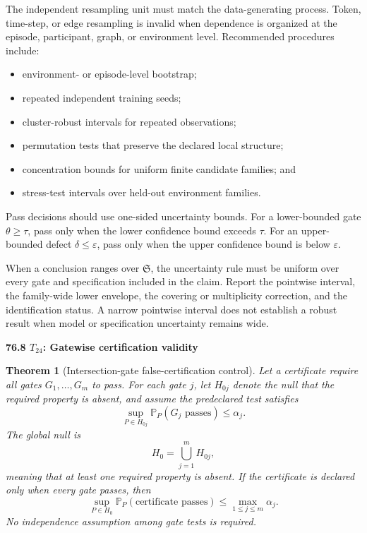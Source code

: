 \documentclass[11pt,letterpaper]{article}
\newcommand{\subtopic}[1]{%
 \vspace{0.45em}
 {\bfseries\color{AccentColor} #1\par}
}
\theoremstyle{plain}
\newtheorem{theorem}{Theorem}
\theoremstyle{definition}
\begin{document}
The independent resampling unit must match the data-generating process. Token,
time-step, or edge resampling is invalid when dependence is organized at the
episode, participant, graph, or environment level. Recommended procedures
include:
\begin{itemize}
\item environment- or episode-level bootstrap;
\item repeated independent training seeds;
\item cluster-robust intervals for repeated observations;
\item permutation tests that preserve the declared local structure;
\item concentration bounds for uniform finite candidate families; and
\item stress-test intervals over held-out environment families.
\end{itemize}

Pass decisions should use one-sided uncertainty bounds. For a lower-bounded
gate \(\theta\geq\tau\), pass only when the lower confidence bound exceeds
\(\tau\). For an upper-bounded defect \(\delta\leq\varepsilon\), pass only when
the upper confidence bound is below \(\varepsilon\).

When a conclusion ranges over \(\mathfrak S\), the uncertainty rule must be
uniform over every gate and specification included in the claim. Report the
pointwise interval, the family-wide lower envelope, the covering or
multiplicity correction, and the identification status. A narrow pointwise
interval does not establish a robust result when model or specification
uncertainty remains wide.

\subtopic{76.8 \(T_{24}\): Gatewise certification validity }

\begin{theorem}[Intersection-gate false-certification control]
\label{thm:gatewise-validity}
Let a certificate require all gates \(G_1,\ldots,G_m\) to pass. For each gate
\(j\), let \(H_{0j}\) denote the null that the required property is absent, and
assume the predeclared test satisfies
\[
\sup_{P\in H_{0j}}
\mathbb P_P(G_j\text{ passes})
\leq
\alpha_j.
\]
The global null is
\[
H_0
=
\bigcup_{j=1}^m H_{0j},
\]
meaning that at least one required property is absent. If the certificate is
declared only when every gate passes, then
\[
\boxed{
\sup_{P\in H_0}
\mathbb P_P(\text{certificate passes})
\leq
\max_{1\leq j\leq m}\alpha_j.
}
\]
No independence assumption among gate tests is required.
\end{theorem}
\end{document}
